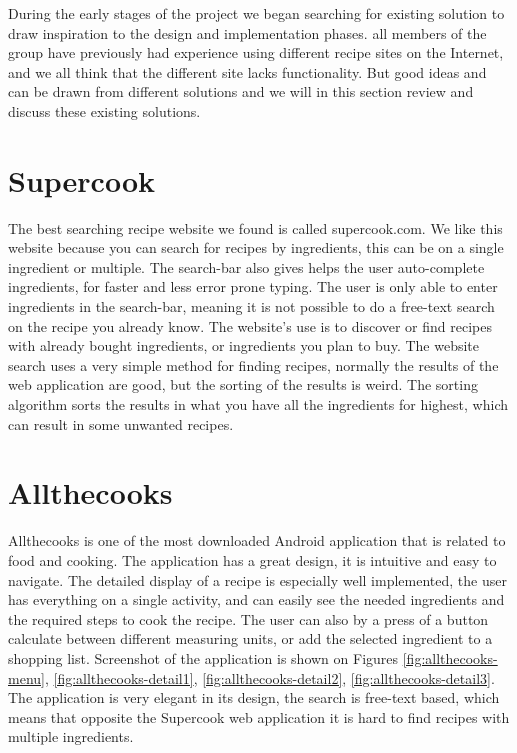 During the early stages of the project we began searching for existing solution to draw inspiration to the design and implementation phases. all members of the group have previously had experience using different recipe sites on the Internet, and we all think that the different site lacks functionality. But good ideas and can be drawn from different solutions and we will in this section review and discuss these existing solutions.  

\section{Supercook}
The best searching recipe website we found is called supercook.com\cite{supercook}. We like this website because you can search for recipes by ingredients, this can be on a single ingredient or multiple. The search-bar also gives helps the user auto-complete ingredients, for faster and less error prone typing. 
The user is only able to enter ingredients in the search-bar, meaning it is not possible to do a free-text search on the recipe you already know. The website's use is to discover or find recipes with already bought ingredients, or ingredients you plan to buy. 
The website search uses a very simple method for finding recipes, normally the results of the web application are good, but the sorting of the results is weird. The sorting algorithm sorts the results in what you have all the ingredients for highest, which can result in some unwanted recipes. 

\section{Allthecooks}
Allthecooks is one of the most downloaded \cite{allthecooks-googleplay} Android application that is related to food and cooking. The application has a great design, it is intuitive and easy to navigate. The detailed display of a recipe is especially well implemented, the user has everything on a single activity, and can easily see the needed ingredients and the required steps to cook the recipe. The user can also by a press of a button calculate between different measuring units, or add the selected ingredient to a shopping list. Screenshot of the application is shown on Figures \ref{fig:allthecooks-menu}, \ref{fig:allthecooks-detail1}, \ref{fig:allthecooks-detail2}, \ref{fig:allthecooks-detail3}. The application is very elegant in its design, the search is free-text based, which means that opposite the Supercook web application it is hard to find recipes with multiple ingredients.

